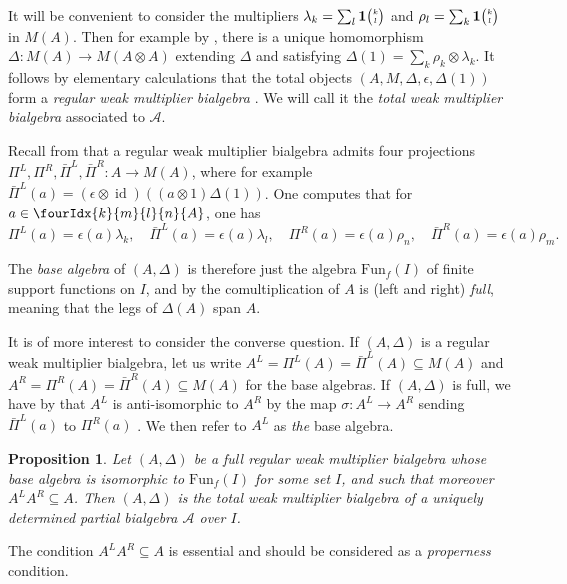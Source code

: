 \documentclass[10pt]{article}
\DeclareMathOperator{\id}{id}
\newcommand{\Fun}{\mathrm{Fun}}
\newcommand{\Grt}[3]{#1{\tiny {\begin{pmatrix} #2\\#3\end{pmatrix}}}}
\newcommand{\UnitC}[2]{\Grt{\mathbf{1}}{#1}{#2}}
\newcommand{\Gr}[5]{\fourIdx{#2}{#4}{#3}{#5}{#1}}%
\newtheorem{Prop}[Theorem]{Proposition}
\theoremstyle{definition}
\numberwithin{equation}{section}
\begin{document}
It will be convenient to consider the multipliers $\lambda_k = \sum_l \UnitC{k}{l}$ and $\rho_l = \sum_k\UnitC{k}{l}$ in $M(A)$. Then for example by \cite[Proposition A.3]{VDW2}, there is a unique homomorphism $\Delta:M(A)\rightarrow M(A\otimes A)$ extending $\Delta$ and satisfying $\Delta(1) = \sum_k \rho_k\otimes \lambda_k$. It follows by elementary calculations that the total objects $(A,M,\Delta,\epsilon,\Delta(1))$ form a \emph{regular weak multiplier bialgebra} \cite[Definition 2.1 and Definition 2.3]{Boh1}. We will call it the \emph{total weak multiplier bialgebra} associated to $\mathscr{A}$.

Recall from \cite[Section 3]{Boh1} that a regular weak multiplier
bialgebra admits four projections $\Pi^L,\Pi^R,\bar{\Pi}^L,\bar{\Pi}^R:A\rightarrow M(A)$, where for example  $\bar{\Pi}^L(a) = (\epsilon\otimes \id)((a\otimes
  1)\Delta(1))$. One computes that for $a\in \Gr{A}{k}{l}{m}{n}$, one has \[ \Pi^L(a) = \epsilon(a)\lambda_k,\quad \bar{\Pi}^L(a) = \epsilon(a) \lambda_l, \quad \Pi^R(a) = \epsilon(a) \rho_n,\quad \bar{\Pi}^R(a) = \epsilon(a)\rho_m.\]

The \emph{base algebra} of $(A,\Delta)$ is therefore just the algebra $\Fun_{f}(I)$ of finite support functions on $I$, and by \cite[Theorem 3.13]{Boh1} the comultiplication of $A$ is (left and right) \emph{full}, meaning that the legs of $\Delta(A)$ span $A$.

It is of more interest to consider the converse question. If $(A,\Delta)$ is a regular weak multiplier bialgebra, let us write $A^L = \Pi^L(A) = \bar{\Pi}^L(A)\subseteq M(A)$ and $A^R = \Pi^R(A)= \bar{\Pi}^R(A)\subseteq M(A)$ for the base algebras. If  $(A,\Delta)$ is full, we have by \cite[Lemma 4.8]{Boh1} that $A^L$ is anti-isomorphic to $A^R$ by the map $\sigma: A^L \rightarrow A^R$ sending $\bar{\Pi}^L(a)$ to $\Pi^R(a)$ . We then refer to $A^L$ as \emph{the} base algebra.

\begin{Prop}\label{PropCharPBA} Let $(A,\Delta)$ be a full regular weak multiplier bialgebra whose base algebra is isomorphic to $\Fun_f(I)$ for some set $I$, and such that moreover $A^LA^R \subseteq A$. Then $(A,\Delta)$ is the total weak multiplier bialgebra of a uniquely determined partial bialgebra $\mathscr{A}$ over $I$.
\end{Prop} 

The condition $A^LA^R \subseteq A$ is essential and should be considered as a \emph{properness} condition. %
\end{document}
